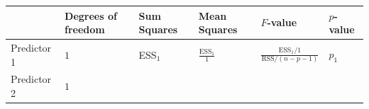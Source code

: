 \documentclass[]{book}
\theoremstyle{definition}
\theoremstyle{definition}
\theoremstyle{definition}
\theoremstyle{remark}
\begin{document}
\begin{longtable}[]{@{}llllll@{}}
\toprule
\begin{minipage}[b]{0.16\columnwidth}\raggedright\strut
\strut
\end{minipage} & \begin{minipage}[b]{0.14\columnwidth}\raggedright\strut
Degrees of freedom\strut
\end{minipage} & \begin{minipage}[b]{0.10\columnwidth}\raggedright\strut
Sum Squares\strut
\end{minipage} & \begin{minipage}[b]{0.11\columnwidth}\raggedright\strut
Mean Squares\strut
\end{minipage} & \begin{minipage}[b]{0.18\columnwidth}\raggedright\strut
\(F\)-value\strut
\end{minipage} & \begin{minipage}[b]{0.15\columnwidth}\raggedright\strut
\(p\)-value\strut
\end{minipage}\tabularnewline
\midrule
\endhead
\begin{minipage}[t]{0.16\columnwidth}\raggedright\strut
Predictor 1\strut
\end{minipage} & \begin{minipage}[t]{0.14\columnwidth}\raggedright\strut
\(1\)\strut
\end{minipage} & \begin{minipage}[t]{0.10\columnwidth}\raggedright\strut
ESS\(_1\)\strut
\end{minipage} & \begin{minipage}[t]{0.11\columnwidth}\raggedright\strut
\(\frac{\text{ESS}_1}{1}\)\strut
\end{minipage} & \begin{minipage}[t]{0.18\columnwidth}\raggedright\strut
\(\frac{\text{ESS}_1/1}{\text{RSS}/(n-p-1)}\)\strut
\end{minipage} & \begin{minipage}[t]{0.15\columnwidth}\raggedright\strut
\(p_1\)\strut
\end{minipage}\tabularnewline
\begin{minipage}[t]{0.16\columnwidth}\raggedright\strut
Predictor 2\strut
\end{minipage} & \begin{minipage}[t]{0.14\columnwidth}\raggedright\strut
\(1\)\strut
\end{minipage} & \begin{minipage}[t]{0.10\columnwidth}\raggedright\strut

\end{minipage}
\end{longtable}
\end{document}
